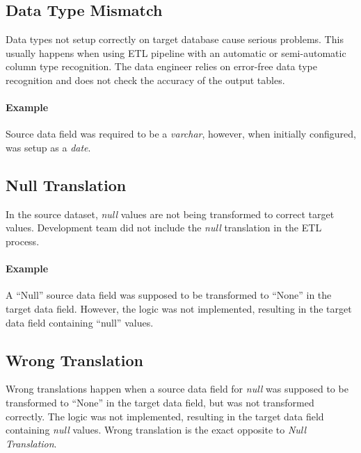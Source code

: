 \subsection*{Data Type Mismatch}

Data types not setup correctly on target database cause serious problems.
This usually happens when using ETL pipeline with an automatic or semi-automatic column type recognition.
The data engineer relies on error-free data type recognition and does not check the accuracy of the output tables.

\paragraph*{Example} Source data field was required to be a \textit{varchar}, however, when initially configured, was setup as a \textit{date}.

\subsection*{Null Translation}

In the source dataset, \textit{null} values are not being transformed to correct target values.
Development team did not include the \textit{null} translation in the ETL process.

\paragraph*{Example} A \enquote{Null} source data field was supposed to be transformed to \enquote{None} in the target data field.
However, the logic was not implemented, resulting in the target data field containing \enquote{null} values\footnotemark.


\subsection*{Wrong Translation}

Wrong translations happen when a source data field for \textit{null} was supposed to be transformed to \enquote{None} in the target data field, but was not transformed correctly.
The logic was not implemented, resulting in the target data field containing \textit{null} values.
Wrong translation is the exact opposite to \textit{Null Translation}.

